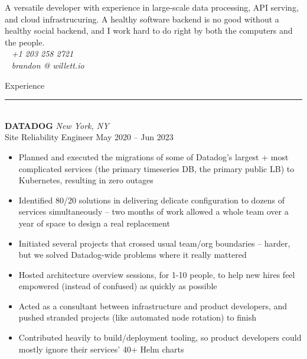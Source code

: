 \documentclass[letterpaper]{article}
\begin{document}
	\begin{bgbox}[height=\paperheight, colback=white, width=0.62\textwidth]\raggedright
		\vspace*{9pt}
		\begin{bgbox}[height=1.60in, colback=gray!15, width=\textwidth, top=0.05in]\raggedright
			A versatile developer with experience in large-scale data processing, API serving, and cloud infrastrucuring. A healthy software backend is no good without a healthy social backend, and I work hard to do right by both the computers and the people. \\[-16pt]
			\null \hfill {\large\Telefon}~ \textit{+1 203 258 2721} \\[-16pt]
			\null \hfill {\large\Letter}~ \textit{brandon @ willett.io }
		\end{bgbox}\vspace*{25.5pt}
		{\Huge{Experience}}\\[-6pt]
		\noindent\rule{\textwidth}{1pt}\\[12pt]
		\textbf{DATADOG} \hfill \textit{New York, NY}\\
		Site Reliability Engineer \hfill May 2020 -- Jun 2023
		\begin{itemize} [noitemsep,topsep=4pt]
			\item Planned and executed the migrations of some of Datadog's largest + most complicated services (the primary timeseries DB, the primary public LB) to Kubernetes, resulting in zero outages
			\item Identified 80/20 solutions in delivering delicate configuration to dozens of services simultaneously -- two months of work allowed a whole team over a year of space to design a real replacement
			\item Initiated several projects that crossed usual team/org boundaries -- harder, but we solved Datadog-wide problems where it really mattered
			\item Hosted architecture overview sessions, for 1-10 people, to help new hires feel empowered (instead of confused) as quickly as possible
			\item Acted as a consultant between infrastructure and product developers, and pushed stranded projects (like automated node rotation) to finish
			\item Contributed heavily to build/deployment tooling, so product developers could mostly ignore their services' 40+ Helm charts

\end{itemize}
\end{bgbox}
\end{document}
